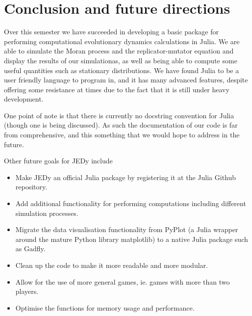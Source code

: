 \section{Conclusion and future directions}

Over this semester we have succeeded in developing a basic package for performing computational evolutionary dynamics calculations in Julia.
We are able to simulate the Moran process and the replicator-mutator equation and display the results of our simulationas, as well as being able to compute some useful quantities such as stationary distributions.
We have found Julia to be a user friendly language to program in, and it has many advanced features, despite offering some resistance at times due to the fact that it is still under heavy development.

One point of note is that there is currently no docstring convention for Julia (though one is being discussed).
As such the documentation of our code is far from comprehensive, and this something that we would hope to address in the future.

Other future goals for JEDy include

\begin{itemize}
    \item Make JEDy an official Julia package by registering it at the Julia Github repository.
    \item Add additional functionality for performing computations including different simulation processes.
    \item Migrate the data visualisation functionality from PyPlot (a Julia wrapper around the mature Python library matplotlib) to a native Julia package such as Gadfly.
    \item Clean up the code to make it more readable and more modular.
    \item Allow for the use of more general games, ie. games with more than two players.
    \item Optimise the functions for memory usage and performance.
\end{itemize}

